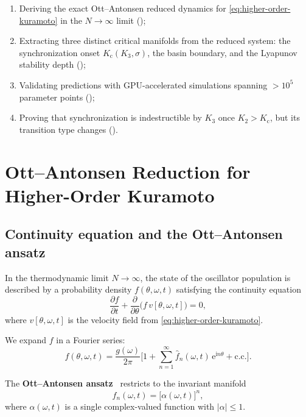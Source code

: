 \documentclass{article}
\newcommand{\ii}{\mathrm{i}}
\newcommand{\ee}{\mathrm{e}}
\newcommand{\Kc}{K_{\mathrm{c}}}
\begin{document}
\begin{enumerate}
  \item Deriving the exact Ott--Antonsen reduced dynamics for
    \eqref{eq:higher-order-kuramoto} in the $N\to\infty$ limit
    ();
  \item Extracting three distinct critical manifolds from the reduced system:
    the synchronization onset $\Kc(K_3,\sigma)$, the basin boundary, and the
    Lyapunov stability depth ();
  \item Validating predictions with GPU-accelerated simulations spanning $>10^5$
    parameter points ();
  \item Proving that synchronization is indestructible by $K_3$ once
    $K_2>\Kc$, but its transition type changes ().
\end{enumerate}


\section{Ott--Antonsen Reduction for Higher-Order Kuramoto}
\label{sec:ott-antonsen}

\subsection{Continuity equation and the Ott--Antonsen ansatz}

In the thermodynamic limit $N\to\infty$, the state of the oscillator
population is described by a probability density $f(\theta,\omega,t)$
satisfying the continuity equation
\begin{equation}
  \frac{\partial f}{\partial t}
  + \frac{\partial}{\partial\theta}\bigl(f\,v[\theta,\omega,t]\bigr) = 0,
  \label{eq:continuity}
\end{equation}
where $v[\theta,\omega,t]$ is the velocity field from \eqref{eq:higher-order-kuramoto}.

We expand $f$ in a Fourier series:
\begin{equation}
  f(\theta,\omega,t)
  = \frac{g(\omega)}{2\pi}\Biggl[
    1 + \sum_{n=1}^{\infty}\hat{f}_n(\omega,t)\,\ee^{\ii n\theta}
    + \text{c.c.}
  \Biggr].
  \label{eq:fourier-expansion}
\end{equation}

The \textbf{Ott--Antonsen ansatz}~\citep{OttAntonsen2008} restricts to the
invariant manifold
\begin{equation}
  \hat{f}_n(\omega,t) = \bigl[\alpha(\omega,t)\bigr]^n,
  \label{eq:oa-ansatz}
\end{equation}
where $\alpha(\omega,t)$ is a single complex-valued function with
$|\alpha|\le 1$.
\end{document}
